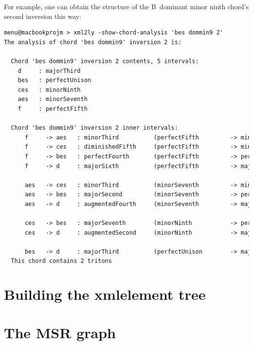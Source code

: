 \documentclass[12pt,a4paper]{article}
\begin{document}
For example, one can obtain the structure of the B\Flat\ dominant minor ninth chord's second inversion this way:
\begin{lstlisting}[language=XML]
menu@macbookprojm > xml2ly -show-chord-analysis 'bes dommin9 2'
The analysis of chord 'bes dommin9' inversion 2 is:

  Chord 'bes dommin9' inversion 2 contents, 5 intervals:
    d     : majorThird
    bes   : perfectUnison
    ces   : minorNinth
    aes   : minorSeventh
    f     : perfectFifth
  
  Chord 'bes dommin9' inversion 2 inner intervals:
      f     -> aes   : minorThird          (perfectFifth         -> minorSeventh)
      f     -> ces   : diminishedFifth     (perfectFifth         -> minorNinth)
      f     -> bes   : perfectFourth       (perfectFifth         -> perfectUnison)
      f     -> d     : majorSixth          (perfectFifth         -> majorThird)
    
      aes   -> ces   : minorThird          (minorSeventh         -> minorNinth)
      aes   -> bes   : majorSecond         (minorSeventh         -> perfectUnison)
      aes   -> d     : augmentedFourth     (minorSeventh         -> majorThird)
    
      ces   -> bes   : majorSeventh        (minorNinth           -> perfectUnison)
      ces   -> d     : augmentedSecond     (minorNinth           -> majorThird)
    
      bes   -> d     : majorThird          (perfectUnison        -> majorThird)
  This chord contains 2 tritons
\end{lstlisting}


\section{Building the xmlelement tree}


\section{The MSR graph}
\end{document}
